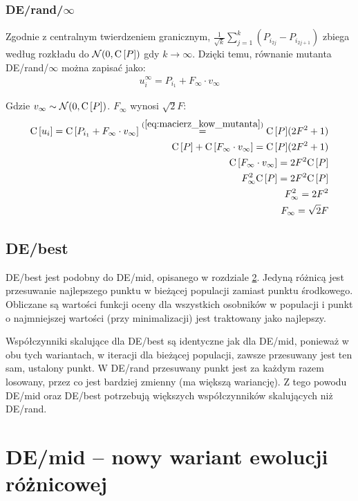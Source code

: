 \documentclass[a4paper,onecolumn,oneside,11pt,wide,floatssmall]{mwrep}
\def\C{{\rm C}\,}
\theoremstyle{definition}
\theoremstyle{plain}%
\theoremstyle{remark}
\begin{document}
\subsection{DE/rand/$\infty$}
\label{sub:de_rand_inf}

Zgodnie z centralnym twierdzeniem granicznym, $\frac{1}{{\sqrt{k}}}\sum\limits_{j=1}^k (P_{i_{2j}} - P_{i_{2j+1}})$ 
zbiega według rozkładu do $\mathcal{N}(0, \C[P])$ gdy $k \to \infty$. 
Dzięki temu, równanie mutanta DE/rand/$\infty$ można zapisać jako:
\begin{align*}
u_i^\infty = P_{i_1} + F_\infty \cdot v_\infty
\end{align*}

Gdzie $v_\infty \sim \mathcal{N}(0, \C[P])$. $F_\infty$ wynosi $\sqrt{2}F$:
\begin{align*}
\C[u_i] = \C[P_{i_1} + F_\infty \cdot v_\infty] \overset{(\ref{eq:macierz_kow_mutanta})}{=} \C[P](2F^2 + 1) \\
\C[P] + \C[F_\infty \cdot v_\infty] = \C[P](2F^2 + 1) \\
\C[F_\infty \cdot v_\infty] = 2F^2\C[P] \\
F_\infty^2 \C[P] = 2F^2\C[P] \\
F_\infty^2 = 2F^2 \\
F_\infty = \sqrt{2}F
\end{align*}

\section{DE/best}

DE/best jest podobny do DE/mid, opisanego w rozdziale \ref{chap:de_mid}. 
Jedyną różnicą jest przesuwanie najlepszego punktu
w bieżącej populacji zamiast punktu środkowego. Obliczane są wartości
funkcji oceny dla wszystkich osobników w populacji i punkt o najmniejszej wartości (przy minimalizacji)
jest traktowany jako najlepszy.

Współczynniki skalujące dla DE/best są identyczne jak dla DE/mid, ponieważ w obu tych wariantach,
w iteracji dla bieżącej populacji, zawsze przesuwany jest ten sam, ustalony punkt. W DE/rand
przesuwany punkt jest za każdym razem losowany, przez co jest bardziej zmienny (ma większą wariancję).
Z tego powodu DE/mid oraz DE/best potrzebują większych współczynników skalujących niż DE/rand.

\chapter{DE/mid -- nowy wariant ewolucji różnicowej}
\label{chap:de_mid}
\end{document}
